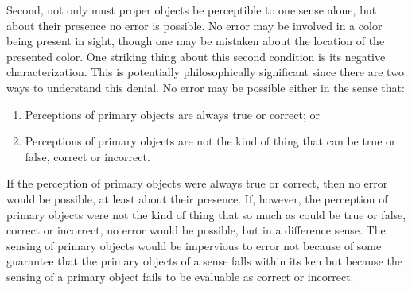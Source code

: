 
Second, not only must proper objects be perceptible to one sense alone, but about their presence no error is possible. No error may be involved in a color being present in sight, though one may be mistaken about the location of the presented color. One striking thing about this second condition is its negative characterization. This is potentially philosophically significant since there are two ways to understand this denial. No error may be possible either in the sense that:
\begin{enumerate}[(1)]
	\item Perceptions of primary objects are always true or correct; or
	\item Perceptions of primary objects are not the kind of thing that can be true or false, correct or incorrect.
\end{enumerate}
If the perception of primary objects were always true or correct, then no error would be possible, at least about their presence. If, however, the perception of primary objects were not the kind of thing that so much as could be true or false, correct or incorrect, no error would be possible, but in a difference sense. The sensing of primary objects would be impervious to error not because of some guarantee that the primary objects of a sense falls within its ken but because the sensing of a primary object fails to be evaluable as correct or incorrect. 


